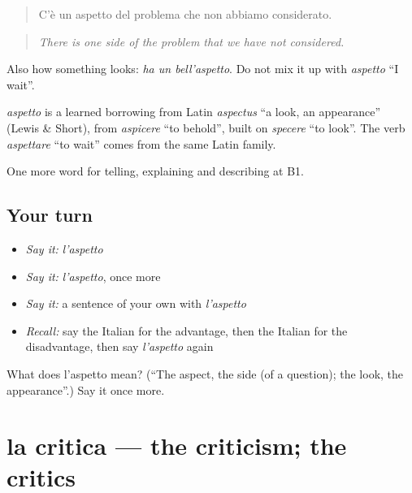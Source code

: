 \begin{quote}
C'è un aspetto del problema che non abbiamo considerato.
\end{quote}

\begin{quote}
\emph{There is one side of the problem that we have not considered.}
\end{quote}

Also how something looks: \emph{ha un bell'aspetto}. Do not mix it up with \emph{aspetto} \textquotedblleft{}I wait\textquotedblright{}.

\begin{cousinweb}
\emph{aspetto} is a learned borrowing from Latin \emph{aspectus} \textquotedblleft{}a look, an appearance\textquotedblright{} (Lewis \& Short), from \emph{aspicere} \textquotedblleft{}to behold\textquotedblright{}, built on \emph{specere} \textquotedblleft{}to look\textquotedblright{}. The verb \emph{aspettare} \textquotedblleft{}to wait\textquotedblright{} comes from the same Latin family.
\end{cousinweb}

\begin{grammarlens}[title={What you've built}]
One more word for telling, explaining and describing at B1.
\end{grammarlens}

\subsection*{Your turn}
\begin{itemize}
\raggedright
  \item \emph{Say it:} \emph{l'aspetto}
  \item \emph{Say it:} \emph{l'aspetto}, once more
  \item \emph{Say it:} a sentence of your own with \emph{l'aspetto}
  \item \emph{Recall:} say the Italian for the advantage, then the Italian for the disadvantage, then say \emph{l'aspetto} again
\end{itemize}

\begin{tcolorbox}[breakable,colback=teal!4,colframe=teal!35!black,title={Before you move on}]
What does l'aspetto mean? (\textquotedblleft{}The aspect, the side (of a question); the look, the appearance\textquotedblright{}.) Say it once more.
\end{tcolorbox}
\section[la critica]{la critica — the criticism; the critics}

